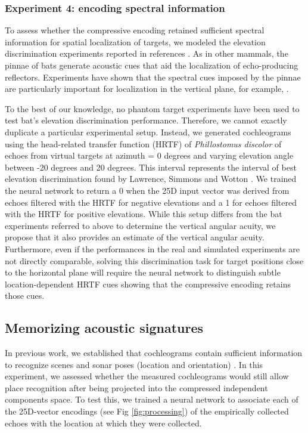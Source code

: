 \documentclass[10pt,letterpaper]{article}
\begin{document}
\subsubsection{Experiment 4: encoding spectral information}

To assess whether the compressive encoding retained sufficient spectral information for spatial localization of targets, we modeled the elevation discrimination experiments reported in references \cite{Lawrence1982,Wotton2000}. As in other mammals, the pinnae of bats generate acoustic cues that aid the localization of echo-producing reflectors. Experiments have shown that the spectral cues imposed by the pinnae are particularly important for localization in the vertical plane, for example, \cite{Aytekin2004,Chiu2007,Lawrence1982,Wotton2000}. 

To the best of our knowledge, no phantom target experiments have been used to test bat's elevation discrimination performance. Therefore, we cannot exactly duplicate a particular experimental setup. Instead, we generated cochleograms using the head-related transfer function (HRTF) of \textit{Phillostomus discolor} \cite{Vanderelst2010a,DeMey2008} of echoes from virtual targets at azimuth = 0 degrees and varying elevation angle between -20 degrees and 20 degrees. This interval represents the interval of best elevation discrimination found by Lawrence, Simmons and Wotton \cite{Lawrence1982,Wotton2000}. We trained the neural network to return a 0 when the 25D input vector was derived from echoes filtered with the HRTF for negative elevations and a 1 for echoes filtered with the HRTF for positive elevations. While this setup differs from the bat experiments referred to above to determine the vertical angular acuity, we propose that it also provides an estimate of the vertical angular acuity. Furthermore, even if the performances in the real and simulated experiments are not directly comparable, solving this discrimination task for target positions close to the horizontal plane will require the neural network to distinguish subtle location-dependent HRTF cues showing that the compressive encoding retains those cues.

\subsection*{Memorizing acoustic signatures}

In previous work, we established that cochleograms contain sufficient information to recognize scenes and sonar poses (location and orientation) \cite{Vanderelst2016}. In this experiment, we assessed whether the measured cochleograms would still allow place recognition after being projected into the compressed independent components space. To test this, we trained a neural network to associate each of the 25D-vector encodings (see Fig \ref{fig:processing}) of the empirically collected echoes with the location at which they were collected. 
\end{document}
